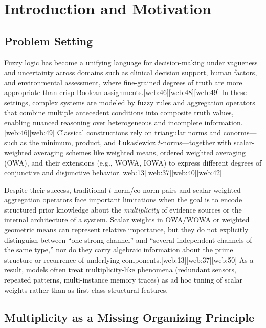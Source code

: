 \documentclass[11pt]{article}
\begin{document}
\section{Introduction and Motivation}
\label{sec:intro}

\subsection{Problem Setting}
\label{subsec:problem-setting}

Fuzzy logic has become a unifying language for decision-making under vagueness and uncertainty across domains such as clinical decision support, human factors, and environmental assessment, where fine-grained degrees of truth are more appropriate than crisp Boolean assignments.[web:46][web:48][web:49] In these settings, complex systems are modeled by fuzzy rules and aggregation operators that combine multiple antecedent conditions into composite truth values, enabling nuanced reasoning over heterogeneous and incomplete information.[web:46][web:49] Classical constructions rely on triangular norms and conorms---such as the minimum, product, and \L{}ukasiewicz $t$-norms---together with scalar-weighted averaging schemes like weighted means, ordered weighted averaging (OWA), and their extensions (e.g., WOWA, IOWA) to express different degrees of conjunctive and disjunctive behavior.[web:13][web:37][web:40][web:42]

Despite their success, traditional $t$-norm/co-norm pairs and scalar-weighted aggregation operators face important limitations when the goal is to encode structured prior knowledge about the \emph{multiplicity} of evidence sources or the internal architecture of a system. Scalar weights in OWA/WOWA or weighted geometric means can represent relative importance, but they do not explicitly distinguish between ``one strong channel'' and ``several independent channels of the same type,'' nor do they carry algebraic information about the prime structure or recurrence of underlying components.[web:13][web:37][web:50] As a result, models often treat multiplicity-like phenomena (redundant sensors, repeated patterns, multi-instance memory traces) as ad hoc tuning of scalar weights rather than as first-class structural features.

\subsection{Multiplicity as a Missing Organizing Principle}
\label{subsec:multiplicity}
\end{document}
